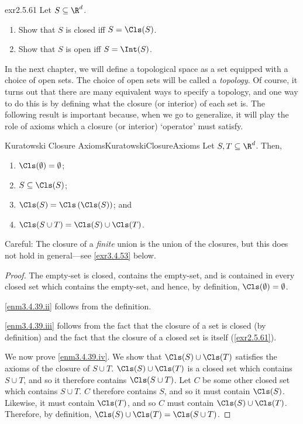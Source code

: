 \begin{exr}{}{exr2.5.61}
Let $S\subseteq \R ^d$.
\begin{enumerate}
\item Show that $S$ is closed iff $S=\Cls (S)$.
\item Show that $S$ is open iff $S=\Int (S)$.
\end{enumerate}
\end{exr}

In the next chapter, we will define a topological space as a set equipped with a choice of open sets.  The choice of open sets will be called a \emph{topology}.  Of course, it turns out that there are many equivalent ways to specify a topology, and one way to do this is by defining what the closure (or interior) of each set is.  The following result is important because, when we go to generalize, it will play the role of axioms which a closure (or interior) `operator' must satisfy.
\begin{thm}{Kuratowski Closure Axioms}{KuratowskiClosureAxioms}
Let $S,T\subseteq \R ^d$.  Then,
\begin{enumerate}
\item \label{enm3.4.39.i}$\Cls (\emptyset) =\emptyset$;
\item \label{enm3.4.39.ii}$S\subseteq \Cls (S)$;
\item \label{enm3.4.39.iii}$\Cls (S)=\Cls \left( \Cls (S)\right)$; and
\item \label{enm3.4.39.iv}$\Cls (S\cup T)=\Cls (S)\cup \Cls (T)$.
\end{enumerate}
\begin{rmk}
Careful:  The closure of a \emph{finite} union is the union of the closures, but this does not hold in general---see \cref{exr3.4.53} below.
\end{rmk}
\begin{proof}
The empty-set is closed, contains the empty-set, and is contained in every closed set which contains the empty-set, and hence, by definition, $\Cls (\emptyset )=\emptyset$.

\cref{enm3.4.39.ii} follows from the definition.

\cref{enm3.4.39.iii} follows from the fact that the closure of a set is closed (by definition) and the fact that the closure of a closed set is itself (\cref{exr2.5.61}).

We now prove \cref{enm3.4.39.iv}.  We show that $\Cls (S)\cup \Cls (T)$ satisfies the axioms of the closure of $S\cup T$.  $\Cls (S)\cup \Cls (T)$ is a closed set which contains $S\cup T$, and so it therefore contains $\Cls (S\cup T)$.  Let $C$ be some other closed set which contains $S\cup T$.  $C$ therefore contains $S$, and so it must contain $\Cls (S)$.  Likewise, it must contain $\Cls (T)$, and so $C$ must contain $\Cls (S)\cup \Cls (T)$.  Therefore, by definition, $\Cls (S)\cup \Cls (T)=\Cls (S\cup T)$.
\end{proof}
\end{thm}
